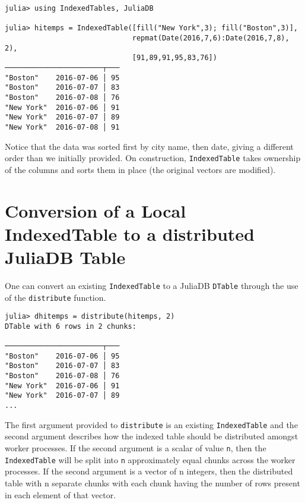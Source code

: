 \documentclass{memoir}
\begin{document}
\begin{verbatim}
julia> using IndexedTables, JuliaDB

julia> hitemps = IndexedTable([fill("New York",3); fill("Boston",3)],
                              repmat(Date(2016,7,6):Date(2016,7,8), 2),
                              [91,89,91,95,83,76])
───────────────────────┬───
"Boston"    2016-07-06 │ 95
"Boston"    2016-07-07 │ 83
"Boston"    2016-07-08 │ 76
"New York"  2016-07-06 │ 91
"New York"  2016-07-07 │ 89
"New York"  2016-07-08 │ 91
\end{verbatim}



Notice that the data was sorted first by city name, then date, giving a different order than we initially provided. On construction, \texttt{IndexedTable} takes ownership of the columns and sorts them in place (the original vectors are modified).



\hypertarget{13986053725508188414}{}


\section{Conversion of a Local IndexedTable to a distributed JuliaDB Table}



One can convert an existing \texttt{IndexedTable} to a JuliaDB \texttt{DTable} through the use of the \texttt{distribute} function.




\begin{verbatim}
julia> dhitemps = distribute(hitemps, 2)
DTable with 6 rows in 2 chunks:

───────────────────────┬───
"Boston"    2016-07-06 │ 95
"Boston"    2016-07-07 │ 83
"Boston"    2016-07-08 │ 76
"New York"  2016-07-06 │ 91
"New York"  2016-07-07 │ 89
...
\end{verbatim}



The first argument provided to \texttt{distribute} is an existing \texttt{IndexedTable} and the second argument describes how the indexed table should be distributed amongst worker processes.  If the second argument is a scalar of value \texttt{n}, then the \texttt{IndexedTable} will be split into \texttt{n} approximately equal chunks across the worker processes.  If the second argument is a vector of n integers, then the distributed table with n separate chunks with each chunk having the number of rows present in each element of that vector.
\end{document}
